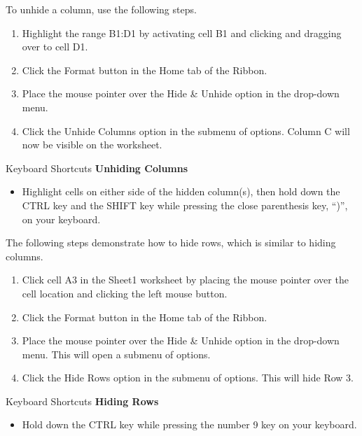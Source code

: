 To unhide a column, use the following steps.

\begin{enumerate}
	\item Highlight the range \textsf{B1:D1} by activating cell \textsf{B1} and clicking and dragging over to cell \textsf{D1}.
	\item Click the Format button in the Home tab of the Ribbon.
	\item Place the mouse pointer over the Hide \& Unhide option in the drop-down menu.
	\item Click the Unhide Columns option in the submenu of options. Column \textsf{C} will now be visible on the worksheet.
\end{enumerate}

\begin{center}
	\begin{shtcutbox}{Keyboard Shortcuts}
		\textbf{Unhiding Columns}
		\\
		\begin{itemize}
			\setlength{\itemsep}{0pt}
			\setlength{\parskip}{0pt}
			\setlength{\parsep}{0pt}
			
			\item Highlight cells on either side of the hidden column(s), then hold down the CTRL key and the SHIFT key while pressing the close parenthesis key, ``)'', on your keyboard.
			
		\end{itemize}
	\end{shtcutbox}
\end{center}

The following steps demonstrate how to hide rows, which is similar to hiding columns.

\begin{enumerate}
	\item Click cell \textsf{A3} in the Sheet1 worksheet by placing the mouse pointer over the cell location and clicking the left mouse button.
	\item Click the Format button in the Home tab of the Ribbon.
	\item Place the mouse pointer over the Hide \& Unhide option in the drop-down menu. This will open a submenu of options.
	\item Click the Hide Rows option in the submenu of options. This will hide Row 3.
\end{enumerate}

\begin{center}
	\begin{shtcutbox}{Keyboard Shortcuts}
		\textbf{Hiding Rows}
		\\
		\begin{itemize}
			\setlength{\itemsep}{0pt}
			\setlength{\parskip}{0pt}
			\setlength{\parsep}{0pt}
			
			\item Hold down the CTRL key while pressing the number 9 key on your keyboard.
			
		\end{itemize}
	\end{shtcutbox}
\end{center}

